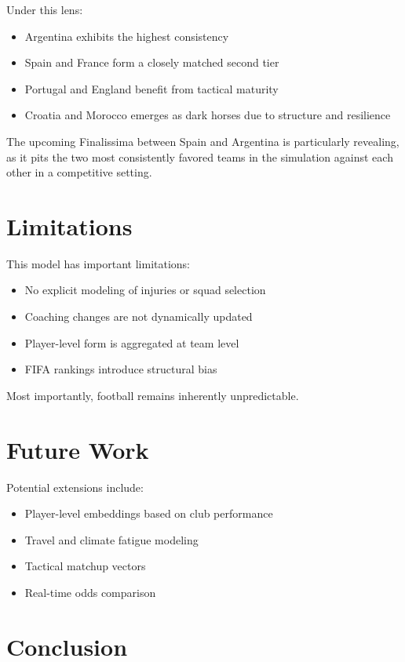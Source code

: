 \documentclass[11pt,a4paper]{article}
\begin{document}
Under this lens:
\begin{itemize}
    \item Argentina exhibits the highest consistency
    \item Spain and France form a closely matched second tier
    \item Portugal and England benefit from tactical maturity
    \item Croatia and Morocco emerges as dark horses due to structure and resilience
\end{itemize}

The upcoming Finalissima between Spain and Argentina is particularly revealing, as it pits the two most consistently favored teams in the simulation against each other in a competitive setting.

\clearpage

\section{Limitations}

This model has important limitations:
\begin{itemize}
    \item No explicit modeling of injuries or squad selection
    \item Coaching changes are not dynamically updated
    \item Player-level form is aggregated at team level
    \item FIFA rankings introduce structural bias
\end{itemize}

Most importantly, football remains inherently unpredictable.

\section{Future Work}

Potential extensions include:
\begin{itemize}
    \item Player-level embeddings based on club performance
    \item Travel and climate fatigue modeling
    \item Tactical matchup vectors
    \item Real-time odds comparison
\end{itemize}

\section{Conclusion}
\end{document}
